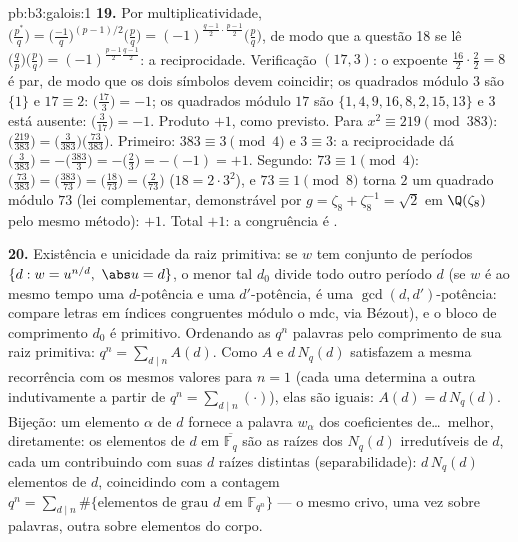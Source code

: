 \begin{solution}{pb:b3:galois:1}
\textbf{19.} Por multiplicatividade, $\bigl(\frac{p^*}q\bigr) =
\bigl(\frac{-1}q\bigr)^{(p-1)/2}\bigl(\frac pq\bigr) =
(-1)^{\frac{q-1}2\cdot\frac{p-1}2}\bigl(\frac pq\bigr)$,
de modo que a questão 18 se lê $\bigl(\frac qp\bigr)\bigl(\frac
pq\bigr) = (-1)^{\frac{p-1}2\frac{q-1}2}$: a reciprocidade.
Verificação $(17, 3)$: o expoente $\frac{16}2\cdot\frac22 = 8$
é par, de modo que os dois símbolos devem coincidir; os quadrados módulo $3$ são $\{1\}$ e $17 \equiv 2$:
$\bigl(\frac{17}3\bigr) = -1$; os quadrados módulo $17$ são $\{1, 4,
9, 16, 8, 2, 15, 13\}$ e $3$ está ausente:
$\bigl(\frac3{17}\bigr) = -1$. Produto $+1$, como previsto. Para $x^2
\equiv 219 \pmod{383}$: $\bigl(\frac{219}{383}\bigr) =
\bigl(\frac3{383}\bigr)\bigl(\frac{73}{383}\bigr)$. Primeiro:
$383 \equiv 3 \pmod4$ e $3 \equiv 3$: a reciprocidade dá
$\bigl(\frac3{383}\bigr) = -\bigl(\frac{383}3\bigr) =
-\bigl(\frac23\bigr) = -(-1) = +1$. Segundo: $73 \equiv 1
\pmod 4$: $\bigl(\frac{73}{383}\bigr) =
\bigl(\frac{383}{73}\bigr) = \bigl(\frac{18}{73}\bigr) =
\bigl(\frac2{73}\bigr)$ ($18 = 2\cdot3^2$), e $73 \equiv 1
\pmod 8$ torna $2$ um quadrado módulo $73$ (lei complementar,
demonstrável por $g = \zeta_8 + \zeta_8^{-1} = \sqrt2$ em
$\Q(\zeta_8)$ pelo mesmo método): $+1$. Total $+1$: a
congruência é .

\textbf{20.} Existência e unicidade da raiz primitiva:
se $w$ tem conjunto de períodos $\{d : w = u^{n/d},\ \abs u = d\}$,
o menor tal $d_0$ divide todo outro período $d$
(se $w$ é ao mesmo tempo uma $d$-potência e uma $d'$-potência, é uma
$\gcd(d, d')$-potência: compare letras em índices congruentes
módulo o mdc, via Bézout), e o bloco de comprimento $d_0$ é
primitivo. Ordenando as $q^n$ palavras pelo comprimento de sua
raiz primitiva: $q^n = \sum_{d \mid n}A(d)$. Como $A$ e
$d\,N_q(d)$ satisfazem a mesma recorrência com os mesmos valores
para $n = 1$ (cada uma determina a outra indutivamente a partir de $q^n
= \sum_{d\mid n}(\cdot)$), elas são iguais: $A(d) =
d\,N_q(d)$. Bijeção: um elemento $\alpha$ de  $d$
fornece a palavra $w_\alpha$ dos coeficientes de\dots\
melhor, diretamente: os elementos de  $d$ em
$\overline{\mathbb F_q}$ são as raízes dos $N_q(d)$
irredutíveis de  $d$, cada um contribuindo com suas $d$
raízes distintas (separabilidade): $d\,N_q(d)$ elementos de
 $d$, coincidindo com a contagem $q^n = \sum_{d\mid n}\#\{
\text{elementos de grau } d \text{ em } \mathbb F_{q^n}\}$
--- o mesmo crivo, uma vez sobre palavras, outra sobre elementos do
corpo.


\end{solution}
